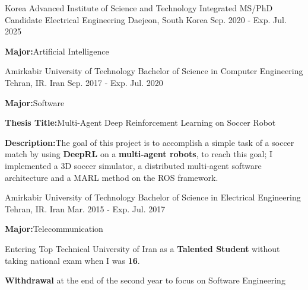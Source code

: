 

\begin{cventries}
  \cventry
    {Korea Advanced Institute of Science and Technology} %
    {Integrated MS/PhD Candidate Electrical Engineering} %
    {Daejeon, South Korea} %
    {Sep. 2020 - Exp. Jul. 2025} %
    {
      \begin{cvitems} %
              \item {\textbf{Major:}\enskip\enskip\enskip\enskip\enskip\enskip\enskip\enskip Artificial Intelligence}
      \end{cvitems}
    }

  \cventry
    {Amirkabir University of Technology} %
    {Bachelor of Science in Computer Engineering} %
    {Tehran, IR. Iran} %
    {Sep. 2017 - Exp. Jul. 2020} %
    {
      \begin{cvitems} %
        \item {\textbf{Major:}\enskip\enskip\enskip\enskip\enskip\enskip\enskip\enskip Software}
        \item {\textbf{Thesis Title:}\enskip\enskip\enskip Multi-Agent Deep Reinforcement Learning on Soccer Robot}
        \item {\textbf{Description:}\enskip\enskip\enskip The goal of this project is to accomplish a simple task of a soccer match by using \textbf{DeepRL} on a \textbf{multi-agent robots}, to reach this goal; I implemented a 3D soccer simulator, a distributed multi-agent software architecture and a MARL method on the ROS framework.}
      \end{cvitems}
    }

  \cventry
    {Amirkabir University of Technology} %
    {Bachelor of Science in Electrical Engineering} %
    {Tehran, IR. Iran} %
    {Mar. 2015 - Exp. Jul. 2017} %
    {
      \begin{cvitems} %
      \item {\textbf{Major:}\enskip\enskip\enskip Telecommunication}
        \item {Entering Top Technical University of Iran as a \textbf{Talented Student} without taking national exam  when I was \textbf{16}.}
        \item {\textbf{Withdrawal} at the end of the second year to focus on Software Engineering}
      \end{cvitems}
    }

\end{cventries}
